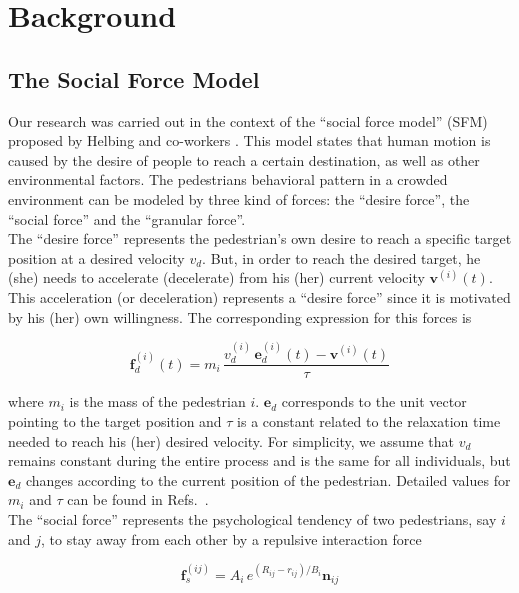 \section{\label{background}Background}

\subsection{\label{sfm}The Social Force Model}

Our research was carried out in the context of the ``social force model'' (SFM) 
proposed by Helbing and co-workers \cite{Helbing1}. This model states that human 
motion is caused by the desire of people to reach a certain destination, as 
well as other environmental factors. The pedestrians behavioral pattern in a 
crowded environment can be modeled by three kind of forces: the ``desire 
force'', the ``social force'' and the ``granular force''.\\

The ``desire force'' represents the pedestrian's own desire to reach a 
specific target position at a desired velocity $v_d$. But, in order to reach 
the desired target, he (she) needs to accelerate (decelerate) from his (her) 
current velocity $\mathbf{v}^{(i)}(t)$. This acceleration (or deceleration) 
represents a ``desire force'' since it is motivated by his (her) own 
willingness. The corresponding expression for this forces is 

\begin{equation}
        \mathbf{f}_d^ {(i)}(t) =  
m_i\,\displaystyle\frac{v_d^{(i)}\,\mathbf{e}_d^
{(i)}(t)-\mathbf{v}^{(i)}(t)}{\tau} \label{desired}
\end{equation}

where $m_i$ is the mass of the pedestrian $i$. $\mathbf{e}_d$ 
corresponds to the unit vector pointing to the target position and $\tau$ is a 
constant related to the relaxation time needed to reach his (her) desired 
velocity. For simplicity, we assume that 
$v_d$ remains constant during the entire process and is the same for all 
individuals, but $\mathbf{e}_d$ changes according to the current position of the 
pedestrian. Detailed values for $m_i$ and $\tau$ can be found in 
Refs.~\cite{Helbing1,Dorso3}. \\

The ``social force'' represents the psychological tendency of two pedestrians,  
say $i$ and $j$, to stay away from each other by a repulsive interaction force 

\begin{equation}
        \mathbf{f}_s^{(ij)} = A_i\,e^{(R_{ij}-r_{ij})/B_i}\mathbf{n}_{ij} 
        \label{social}
\end{equation}

